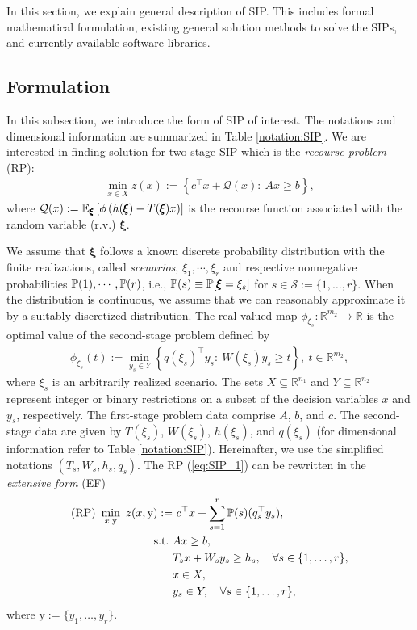 In this section, we explain general description of SIP. This includes formal mathematical formulation, existing general solution methods to solve the SIPs, and currently available software libraries.
\subsection{Formulation}
In this subsection, we introduce the form of SIP of interest. The notations and dimensional information are summarized in Table \ref{notation:SIP}. We are interested in finding solution for two-stage SIP which is the \textit{recourse problem} (RP): 
\begin{align}
\min_{x\in X} z(x):={\left\{c^\top x + \mathcal{Q}(x):\ Ax\ge b\right\}}, \label{eq:SIP_1}
\end{align}
where $\mathcal{Q}(x):=\operatorname*{\mathbb{E}}_{\pmb{\xi}}\left[ \phi\left( h(\pmb{\xi})-T(\pmb{\xi})x \right) \right]$ is the recourse function associated with the random variable (r.v.) $\pmb{\xi}$. 

We assume that $\pmb{\xi}$ follows a known discrete probability distribution with the finite realizations, called \textit{scenarios}, $\xi_1,\cdots,\xi_r$ and respective nonnegative probabilities $\operatorname*{\mathbb{P}}(1),\cdots,\operatorname*{\mathbb{P}}(r)$, i.e., $\operatorname*{\mathbb{P}}(s)\equiv\operatorname*{\mathbb{P}}[\pmb{\xi}=\xi_s]$ for $s\in\mathcal{S}:=\{1,\ldots,r\}$. When the distribution is continuous, we assume that we can reasonably approximate it by a suitably discretized distribution. The real-valued map $\phi_{\xi_s}:\mathbb{R}^{m_2}\to\mathbb{R}$ is the optimal value of the second-stage problem defined by
\begin{align}
\phi_{\xi_s}(t):=\min_{y_s\in Y}\left\{ q(\xi_s)^\top y_s:\ W(\xi_s)y_s \ge t \right\},\ t\in\mathbb{R}^{m_2},
\end{align}
where $\xi_s$ is an arbitrarily realized scenario.
The sets $X\subseteq \mathbb{R}^{n_1}$ and $Y\subseteq\mathbb{R}^{n_2}$ represent integer or binary restrictions on a subset of the decision variables $x$ and $y_s$, respectively. 
The first-stage problem data comprise $A$, $b$, and $c$. The second-stage data are given by $T(\xi_s)$, $W(\xi_s)$, $h(\xi_s)$, and $q(\xi_s)$ (for dimensional information refer to Table \ref{notation:SIP}). Hereinafter, we use the simplified notations $(T_s,W_s,h_s,q_s)$. The RP (\ref{eq:SIP_1}) can be rewritten in the \textit{extensive form} (EF)
\begin{subequations}\label{sip:ef}
\begin{align}
\textrm{(RP) }\min_{x,\mathrm{y}}\ z(x,\mathrm{y}):=&\ c^{\top}x + \sum_{s=1}^{r}\operatorname*{\mathbb{P}}(s) (q_s^{\top}y_s), \label{ef:obj}\\ 
\mathrm{s.t.}\ &Ax\ge b,  \label{ef:b}\\
	&T_s x+W_s y_s\ge h_s,\quad\forall s\in\{1,\ldots,r\}, \label{ef:c} \\
	&x\in X, \label{ef:d} \\
	&y_s \in Y,\quad\forall s\in\{1,\ldots,r\}, \label{ef:e}
\end{align}
\end{subequations}
where $\mathrm{y}:=\{y_1,\ldots,y_r\}$.

